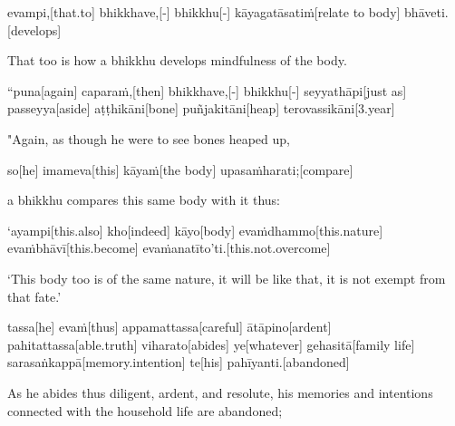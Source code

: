 \begin{samepage}
\begingl[glneveryline={\PaliGlossA,\PaliGlossB}]
evampi,[that.to] bhikkhave,[-] bhikkhu[-] kāyagatāsatiṁ[relate to body] bhāveti.[develops]
\endgl
\nopagebreak
\linespread{0.5}
\begin{spacin}{0.2}
{\PaliGlossFT That too is how a bhikkhu develops mindfulness of the body.}
\end{spacin}
\vskip 12pt
\end{samepage}
\vskip 0.2in
\begin{samepage}
\begingl[glneveryline={\PaliGlossA,\PaliGlossB}]
“puna[again] caparaṁ,[then] bhikkhave,[-] bhikkhu[-] seyyathāpi[just as] passeyya[aside] aṭṭhikāni[bone] puñjakitāni[heap] terovassikāni[3.year]
\endgl
\nopagebreak
\linespread{0.5}
\begin{spacin}{0.2}
{\PaliGlossFT "Again, as though he were to see bones heaped up,}
\end{spacin}
\vskip 12pt
\end{samepage}
\begin{samepage}
\begingl[glneveryline={\PaliGlossA,\PaliGlossB}]
so[he] imameva[this] kāyaṁ[the body] upasaṁharati;[compare]
\endgl
\nopagebreak
\linespread{0.5}
\begin{spacin}{0.2}
{\PaliGlossFT a bhikkhu compares this same body with it thus:}
\end{spacin}
\vskip 12pt
\end{samepage}
\begin{samepage}
\begingl[glneveryline={\PaliGlossA,\PaliGlossB}]
‘ayampi[this.also] kho[indeed] kāyo[body] evaṁdhammo[this.nature] evaṁbhāvī[this.become] evaṁanatīto’ti.[this.not.overcome]
\endgl
\nopagebreak
\linespread{0.5}
\begin{spacin}{0.2}
{\PaliGlossFT ‘This body too is of the same nature, it will be like that, it is not exempt from that fate.’}
\end{spacin}
\vskip 12pt
\end{samepage}
\begin{samepage}
\begingl[glneveryline={\PaliGlossA,\PaliGlossB}]
tassa[he] evaṁ[thus] appamattassa[careful] ātāpino[ardent] pahitattassa[able.truth] viharato[abides] ye[whatever] gehasitā[family life] sarasaṅkappā[memory.intention] te[his] pahīyanti.[abandoned]
\endgl
\nopagebreak
\linespread{0.5}
\begin{spacin}{0.2}
{\PaliGlossFT As he abides thus diligent, ardent, and resolute, his memories and intentions connected with the household life are abandoned;}
\end{spacin}
\vskip 12pt
\end{samepage}
